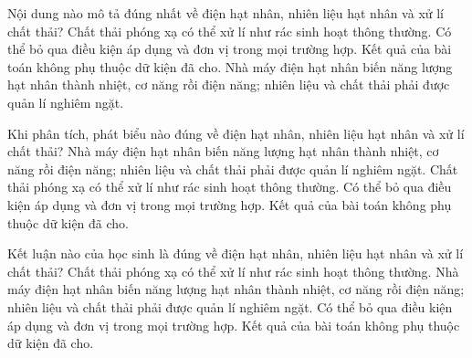 \begin{ex}
Nội dung nào mô tả đúng nhất về điện hạt nhân, nhiên liệu hạt nhân và xử lí chất thải?
\choice
{Chất thải phóng xạ có thể xử lí như rác sinh hoạt thông thường.}
{Có thể bỏ qua điều kiện áp dụng và đơn vị trong mọi trường hợp.}
{Kết quả của bài toán không phụ thuộc dữ kiện đã cho.}
{\True Nhà máy điện hạt nhân biến năng lượng hạt nhân thành nhiệt, cơ năng rồi điện năng; nhiên liệu và chất thải phải được quản lí nghiêm ngặt.}
\end{ex}

\begin{ex}
Khi phân tích, phát biểu nào đúng về điện hạt nhân, nhiên liệu hạt nhân và xử lí chất thải?
\choice
{\True Nhà máy điện hạt nhân biến năng lượng hạt nhân thành nhiệt, cơ năng rồi điện năng; nhiên liệu và chất thải phải được quản lí nghiêm ngặt.}
{Chất thải phóng xạ có thể xử lí như rác sinh hoạt thông thường.}
{Có thể bỏ qua điều kiện áp dụng và đơn vị trong mọi trường hợp.}
{Kết quả của bài toán không phụ thuộc dữ kiện đã cho.}
\end{ex}

\begin{ex}
Kết luận nào của học sinh là đúng về điện hạt nhân, nhiên liệu hạt nhân và xử lí chất thải?
\choice
{Chất thải phóng xạ có thể xử lí như rác sinh hoạt thông thường.}
{\True Nhà máy điện hạt nhân biến năng lượng hạt nhân thành nhiệt, cơ năng rồi điện năng; nhiên liệu và chất thải phải được quản lí nghiêm ngặt.}
{Có thể bỏ qua điều kiện áp dụng và đơn vị trong mọi trường hợp.}
{Kết quả của bài toán không phụ thuộc dữ kiện đã cho.}
\end{ex}

